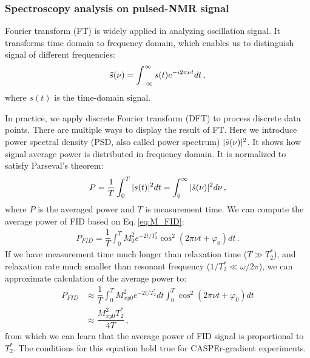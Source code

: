 \subsubsection{Spectroscopy analysis on pulsed-NMR signal}

Fourier transform (FT) is widely applied in analyzing oscillation signal. It transforms time domain to frequency domain, which enables us to distinguish signal of different frequencies:
\begin{align}
    \Tilde{s}(\nu) = \int_{-\infty}^{\infty} s(t) e^{-i2\pi \nu t} dt\,,
\end{align}
where $s(t)$ is the time-domain signal. 

In practice, we apply discrete Fourier transform (DFT) to process discrete data points. There are multiple ways to display the result of FT. 
Here we introduce power spectral density (PSD, also called power spectrum) $|\Tilde{s}(\nu)|^2$. It shows how signal average power is distributed in frequency domain. It is normalized to satisfy Parseval’s theorem: 
\begin{align}
    P = \dfrac{1}{T} \int_{0}^{T} |s(t)|^2 dt = \int_{0}^{\infty} |\Tilde{s}(\nu)|^2 d \nu\,,\label{eq:Parseval}
\end{align}
where $P$ is the averaged power and $T$ is measurement time. 
We can compute the average power of FID based on Eq.\,\eqref{eq:M_FID}:
\begin{align}
    P_{FID} = \dfrac{1}{T} \int_{0}^{T} M_0^2 e^{-2t/T_2^*} \cos^2 (2 \pi \nu t + \varphi_0) dt\,. 
\end{align}
If we have measurement time much longer than relaxation time ($T \gg T_2^*$), and relaxation rate much smaller than resonant frequency ($1/T_2^* \ll \omega/2\pi$), we can approximate calculation of the average power to:
\begin{align}
    P_{FID} &\approx \dfrac{1}{T} \int_{0}^{T} M_{xy0}^2 e^{-2t/T_2^*} dt \int_{0}^{T} \cos^2 (2 \pi \nu t + \varphi_0) dt \\
     &\approx  \dfrac{M_{xy0}^2 T_2^*}{4 T}\,, \label{eq:PFID}
\end{align}
from which we can learn that the average power of FID signal is proportional to $T_2^*$. The conditions for this equation hold true for CASPEr-gradient experiments. 

